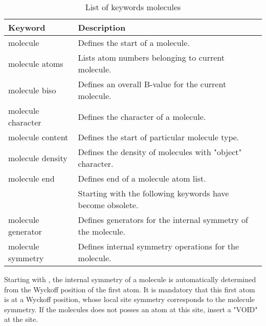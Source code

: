 \begin{table}[!tbh]
\centering
\begin{tabularx}{\textwidth}{|p{35mm}|X|}
  \hline
  {\bf Keyword} & {\bf Description} \\
  \hline\hline
  molecule           & Defines the start of a molecule.\\
  molecule atoms     & Lists atom numbers belonging to current molecule.\\
  molecule biso      & Defines an overall B-value for the current molecule.\\
  molecule character & Defines the character of a molecule.\\
  molecule content   & Defines the start of particular molecule type.\\
  molecule density   & Defines the density of molecules with "object"
                       character.\\
  molecule end       & Defines end of a molecule atom list.\\
  \hline 
                     & Starting with \Discus 3.6 the following 
                       keywords have become obsolete.\\
  molecule generator & Defines generators for the internal symmetry of
                       the molecule.\\
  molecule symmetry  & Defines internal symmetry operations for the molecule.\\
  \hline
\end{tabularx}
\caption{\label{struc-mole-tab1} List of keywords molecules}
\end{table}

Starting with , the internal symmetry of a molecule
is automatically determined from the Wyckoff position of the first
atom. It is mandatory that this first atom is at a Wyckoff position,
whose local site symmetry corresponds to the molecule symmetry. If 
the molecules does not posses an atom at this site, insert a 
"VOID" at the site.

